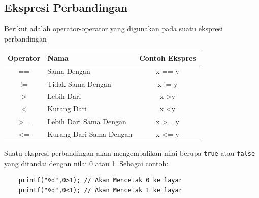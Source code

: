 \subsection{Ekspresi Perbandingan}
Berikut adalah operator-operator yang digunakan pada suatu ekspresi perbandingan
\begin{center}
	\begin{tabular}{|c|l|c|}
		\hline
		\textbf{Operator} & \textbf{Nama}           & \multicolumn{1}{l|}{\textbf{Contoh Ekspres}} \\ \hline
		==                & Sama Dengan             & x == y                                       \\ \hline
		!=                & Tidak Sama Dengan       & x != y                                       \\ \hline
		\textgreater{}    & Lebih Dari              & x \textgreater y                             \\ \hline
		\textless{}       & Kurang Dari             & x \textless y                                \\ \hline
		\textgreater{}=   & Lebih Dari Sama Dengan  & x \textgreater{}= y                          \\ \hline
		\textless{}=      & Kurang Dari Sama Dengan & x \textless{}= y                             \\ \hline
	\end{tabular}
\end{center}

Suatu ekspresi perbandingan akan mengembalikan nilai berupa \verb|true| atau \verb|false| yang ditandai dengan nilai 0 atau 1.
Sebagai contoh:
\begin{verbatim}
    printf("%d",0>1); // Akan Mencetak 0 ke layar
    printf("%d",0<1); // Akan Mencetak 1 ke layar 
\end{verbatim}

